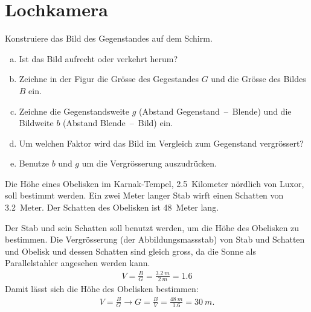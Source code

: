 \documentclass[paper=a4,twoside=true,,DIV13,BCOR1cm]{scrartcl}
\begin{document}
\section{Lochkamera}
\begin{aufgabe}
	Konstruiere das Bild des Gegenstandes auf dem Schirm.


\begin{enumerate}[a)]
	\item Ist das Bild aufrecht oder verkehrt herum?
	\item Zeichne in der Figur die Grösse des Gegestandes $G$ und die Grösse des Bildes $B$ ein.
	\item Zeichne die Gegenstandsweite $g$ (Abstand Gegenstand\ --\ Blende) und die Bildweite $b$
		(Abstand Blende\ --\ Bild) ein.
	\item Um welchen Faktor wird das Bild im Vergleich zum Gegenstand vergrössert?
	\item Benutze $b$ und $g$ um die Vergrösserung auszudrücken.
\end{enumerate}
\end{aufgabe}

\begin{aufgabe}
	Die Höhe eines Obelisken im Karnak-Tempel, \SI{2,5}{Kilometer} nördlich von Luxor, soll bestimmt werden.
	Ein zwei Meter langer Stab wirft einen Schatten von \SI{3,2}{Meter}. Der Schatten des Obelisken ist \SI{48}{Meter} lang.
	\begin{loesung}
		Der Stab und sein Schatten soll benutzt werden, um die Höhe des Obelisken zu bestimmen. Die Vergrösserung (der Abbildungsmassstab)
		von Stab und Schatten und Obelisk und dessen Schatten sind gleich gross, da die Sonne als Parallelstahler angesehen werden kann.
		\begin{eqnarray*}
			V=\frac{B}{G}=\frac{\SI{3.2}{m}}{\SI{2}{m}} = \num{1.6}
		\end{eqnarray*}
		Damit lässt sich die Höhe des Obelisken bestimmen:
		\begin{eqnarray*}
			V=\frac{B}{G}\to G=\frac{B}{V}=\frac{\SI{48}{m}}{\num{1.6}}=\SI{30}{m}\text{.}
		\end{eqnarray*}
	\end{loesung}
\end{aufgabe}
\end{document}
